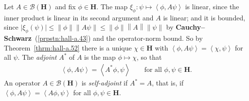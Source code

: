 \begin{definition}
    \label{def:adjoint-bounded}
    \leanok
    Let $A \in \mathcal{B}(\mathbf{H})$ and fix $\phi \in \mathbf{H}$. The map $\xi_\phi : \psi \mapsto \left< \phi, A\psi \right>$ is linear, since the inner product is linear in its second argument and $A$ is linear; and it is bounded, since $\lvert \xi_\phi(\psi) \rvert \le \left\| \phi \right\| \left\| A\psi \right\| \le \left\| \phi \right\| \left\| A \right\| \left\| \psi \right\|$ by \textbf{Cauchy–Schwarz}~(\ref{prpstn:hall-a.43}) and the operator-norm bound. So by Theorem~\ref{thrm:hall-a.52} there is a unique $\chi \in \mathbf{H}$ with $\left< \phi, A\psi \right> = \left< \chi, \psi \right>$ for all $\psi$. The \textit{adjoint} $A^*$ of $A$ is the map $\phi \mapsto \chi$, so that
    \begin{align}
        \left< \phi, A\psi \right> = \left< A^*\phi, \psi \right> \qquad \text{for all } \phi, \psi \in \mathbf{H}.
    \end{align}
    An operator $A \in \mathcal{B}(\mathbf{H})$ is \textit{self-adjoint} if $A^* = A$, that is, if $\left< \phi, A\psi \right> = \left< A\phi, \psi \right>$ for all $\phi, \psi \in \mathbf{H}$.
\end{definition}


